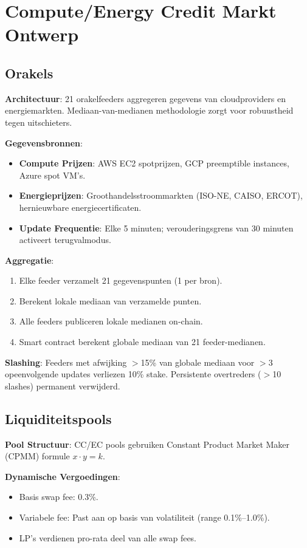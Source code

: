 \documentclass[11pt]{article}
\begin{document}
\section{Compute/Energy Credit Markt Ontwerp}
\subsection{Orakels}
\textbf{Architectuur}: 21 orakelfeeders aggregeren gegevens van cloudproviders en energiemarkten. Mediaan-van-medianen methodologie zorgt voor robuustheid tegen uitschieters.

\textbf{Gegevensbronnen}:
\begin{itemize}[noitemsep]
  \item \textbf{Compute Prijzen}: AWS EC2 spotprijzen, GCP preemptible instances, Azure spot VM's.
  \item \textbf{Energieprijzen}: Groothandelsstroommarkten (ISO-NE, CAISO, ERCOT), hernieuwbare energiecertificaten.
  \item \textbf{Update Frequentie}: Elke 5 minuten; verouderingsgrens van 30 minuten activeert terugvalmodus.
\end{itemize}

\textbf{Aggregatie}:
\begin{enumerate}[noitemsep]
  \item Elke feeder verzamelt 21 gegevenspunten (1 per bron).
  \item Berekent lokale mediaan van verzamelde punten.
  \item Alle feeders publiceren lokale medianen on-chain.
  \item Smart contract berekent globale mediaan van 21 feeder-medianen.
\end{enumerate}

\textbf{Slashing}: Feeders met afwijking $>$15\% van globale mediaan voor $>$3 opeenvolgende updates verliezen 10\% stake. Persistente overtreders ($>$10 slashes) permanent verwijderd.

\subsection{Liquiditeitspools}
\textbf{Pool Structuur}: CC/EC pools gebruiken Constant Product Market Maker (CPMM) formule $x \cdot y = k$.

\textbf{Dynamische Vergoedingen}:
\begin{itemize}[noitemsep]
  \item Basis swap fee: 0.3\%.
  \item Variabele fee: Past aan op basis van volatiliteit (range 0.1\%--1.0\%).
  \item LP's verdienen pro-rata deel van alle swap fees.
\end{itemize}
\end{document}
